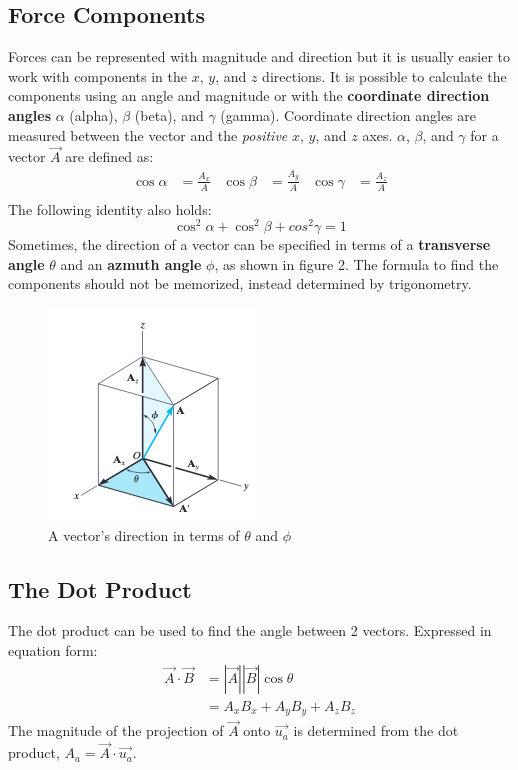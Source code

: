 \documentclass[12pt]{article}
\begin{document}
\subsection{Force Components}
Forces can be represented with magnitude and direction but it is usually easier to work with components in the $x$, $y$, and $z$ directions.
It is possible to calculate the components using an angle and magnitude or with the \textbf{coordinate direction angles} $\alpha$ (alpha), $\beta$ (beta), and $\gamma$ (gamma).
Coordinate direction angles are measured between the vector and the \textit{positive} $x$, $y$, and $z$ axes.
$\alpha$, $\beta$, and $\gamma$ for a vector $\vec{A}$ are defined as:
\begin{align*}
    \cos{\alpha} &= \frac{A_x}{A} & \cos{\beta} &= \frac{A_y}{A} & \cos{\gamma} &= \frac{A_z}{A} \\
\end{align*}
The following identity also holds:
\begin{equation*}
    \cos^2{\alpha} + \cos^2{\beta} + cos^2{\gamma} = 1
\end{equation*}
Sometimes, the direction of a vector can be specified in terms of a \textbf{transverse angle} $\theta$ and an \textbf{azmuth angle} $\phi$, as shown in figure 2.
The formula to find the components should not be memorized, instead determined by trigonometry.
\begin{figure}[h]
\centering
\includegraphics[scale=0.7]{transverse_azmuth.png}
\caption{A vector's direction in terms of $\theta$ and $\phi$ \cite{hibbeler}}
\end{figure}
\pagebreak

\subsection{The Dot Product}
The dot product can be used to find the angle between 2 vectors.
Expressed in equation form:
\begin{align*}
    \vec{A}\cdot\vec{B} &= \left|\vec{A}\right|\left|\vec{B}\right|\cos{\theta} \\
                        &= A_xB_x + A_yB_y + A_zB_z
\end{align*}
The magnitude of the projection of $\vec{A}$ onto $\vec{u_a}$ is determined from the dot product, $A_a = \vec{A}\cdot\vec{u_a}$.
\end{document}
